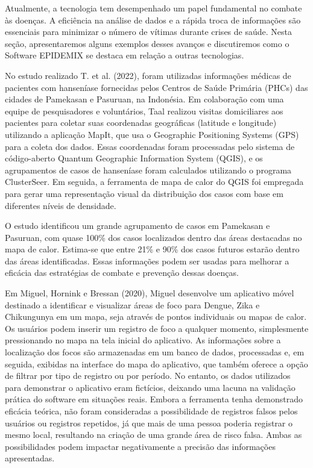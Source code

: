 Atualmente, a tecnologia tem desempenhado um papel fundamental no combate às doenças. A eficiência na análise de dados e a rápida troca de informações são essenciais para minimizar o número de vítimas durante crises de saúde. Nesta seção, apresentaremos alguns exemplos desses avanços e discutiremos como o Software EPIDEMIX se destaca em relação a outras tecnologias.

No estudo realizado T. et al. (2022), foram utilizadas informações médicas de pacientes com hanseníase fornecidas pelos Centros de Saúde Primária (PHCs) das cidades de Pamekasan e Pasuruan, na Indonésia. Em colaboração com uma equipe de pesquisadores e voluntários, Taal realizou visitas domiciliares aos pacientes para coletar suas coordenadas geográficas (latitude e longitude) utilizando a aplicação MapIt, que usa o Geographic Positioning Systems (GPS) para a coleta dos dados. Essas coordenadas foram processadas pelo sistema de código-aberto Quantum Geographic Information System (QGIS), e os agrupamentos de casos de hanseníase foram calculados utilizando o programa ClusterSeer. Em seguida, a ferramenta de mapa de calor do QGIS foi empregada para gerar uma representação visual da distribuição dos casos com base em diferentes níveis de densidade.

O estudo identificou um grande agrupamento de casos em Pamekasan e Pasuruan, com quase 100\% dos casos localizados dentro das áreas destacadas no mapa de calor. Estima-se que entre 21\% e 90\% dos casos futuros estarão dentro das áreas identificadas. Essas informações podem ser usadas para melhorar a eficácia das estratégias de combate e prevenção dessas doenças.

Em Miguel, Hornink e Bressan (2020), Miguel desenvolve um aplicativo móvel destinado a identificar e visualizar áreas de foco para Dengue, Zika e Chikungunya em um mapa, seja através de pontos individuais ou mapas de calor. Os usuários podem inserir um registro de foco a qualquer momento, simplesmente pressionando no mapa na tela inicial do aplicativo. As informações sobre a localização dos focos são armazenadas em um banco de dados, processadas e, em seguida, exibidas na interface do mapa do aplicativo, que também oferece a opção de filtrar por tipo de registro ou por período. No entanto, os dados utilizados para demonstrar o aplicativo eram fictícios, deixando uma lacuna na validação prática do software em situações reais. Embora a ferramenta tenha demonstrado eficácia teórica, não foram consideradas a possibilidade de registros falsos pelos usuários ou registros repetidos, já que mais de uma pessoa poderia registrar o mesmo local, resultando na criação de uma grande área de risco falsa. Ambas as possibilidades podem impactar negativamente a precisão das informações apresentadas.



